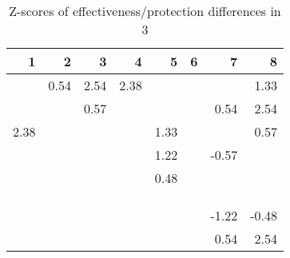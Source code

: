 \begin{table}[ht]
\centering
\begin{tabular}{rrrrrrrr}
  \hline
1 & 2 & 3 & 4 & 5 & 6 & 7 & 8 \\ 
  \hline
 & 0.54 & 2.54 & 2.38 &  &  &  & 1.33 \\ 
   &  & 0.57 &  &  &  & 0.54 & 2.54 \\ 
  2.38 &  &  &  & 1.33 &  &  & 0.57 \\ 
   &  &  &  & 1.22 &  & -0.57 &  \\ 
   &  &  &  & 0.48 &  &  &  \\ 
   &  &  &  &  &  &  &  \\ 
   &  &  &  &  &  &  &  \\ 
   &  &  &  &  &  &  &  \\ 
   &  &  &  &  &  & -1.22 & -0.48 \\ 
   &  &  &  &  &  & 0.54 & 2.54 \\ 
   \hline
\end{tabular}
\caption{Z-scores of effectiveness/protection differences in  3} 
\end{table}
